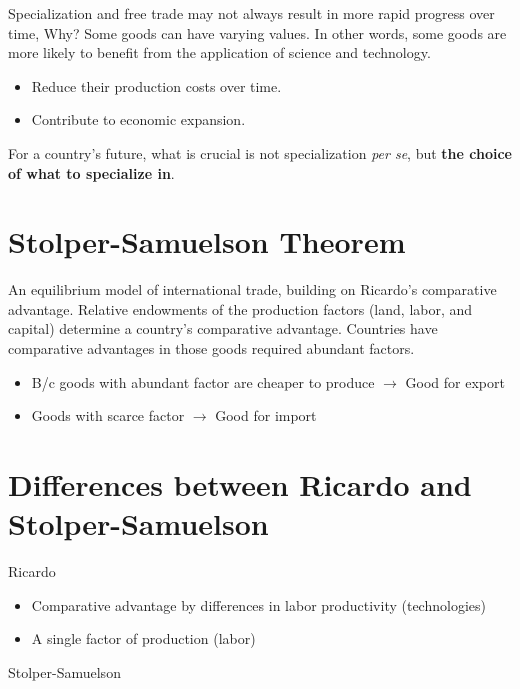\documentclass[
]{book}
\begin{document}
Specialization and free trade may not always result in more rapid progress over time, Why? Some goods can have varying values. In other words, some goods are more likely to benefit from the application of science and technology.

\begin{itemize}
\item
  Reduce their production costs over time.
\item
  Contribute to economic expansion.
\end{itemize}

For a country's future, what is crucial is not specialization \emph{per se}, but \textbf{the choice of what to specialize in}.

\hypertarget{stolper-samuelson-theorem}{%
\section{Stolper-Samuelson Theorem}\label{stolper-samuelson-theorem}}

An equilibrium model of international trade, building on Ricardo's comparative advantage. Relative endowments of the production factors (land, labor, and capital) determine a country's comparative advantage. Countries have comparative advantages in those goods required abundant factors.

\begin{itemize}
\item
  B/c goods with abundant factor are cheaper to produce \(\rightarrow\) Good for export
\item
  Goods with scarce factor \(\rightarrow\) Good for import
\end{itemize}

\hypertarget{differences-between-ricardo-and-stolper-samuelson}{%
\section{Differences between Ricardo and Stolper-Samuelson}\label{differences-between-ricardo-and-stolper-samuelson}}

Ricardo

\begin{itemize}
\item
  Comparative advantage by differences in labor productivity (technologies)
\item
  A single factor of production (labor)
\end{itemize}

Stolper-Samuelson
\end{document}
